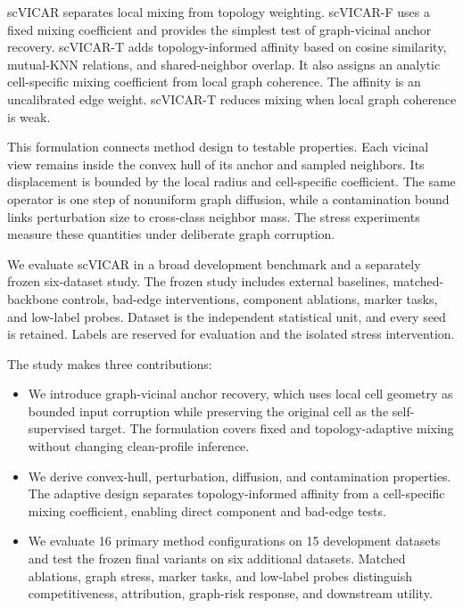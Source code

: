 scVICAR separates local mixing from topology weighting. scVICAR-F uses
a fixed mixing coefficient and provides the simplest test of graph-vicinal
anchor recovery. scVICAR-T adds topology-informed affinity based on cosine
similarity, mutual-KNN relations, and shared-neighbor overlap. It also assigns
an analytic cell-specific mixing coefficient from local graph coherence. The
affinity is an uncalibrated edge weight. scVICAR-T reduces mixing when local
graph coherence is weak.

This formulation connects method design to testable properties. Each vicinal
view remains inside the convex hull of its anchor and sampled neighbors. Its
displacement is bounded by the local radius and cell-specific coefficient. The same
operator is one step of nonuniform graph diffusion, while a contamination bound
links perturbation size to cross-class neighbor mass. The stress experiments
measure these quantities under deliberate graph corruption.

We evaluate scVICAR in a broad development benchmark and a separately frozen
six-dataset study. The frozen study includes external baselines,
matched-backbone controls, bad-edge interventions, component ablations, marker
tasks, and low-label probes. Dataset is the independent statistical unit, and
every seed is retained. Labels are reserved for evaluation and the isolated
stress intervention.

The study makes three contributions:
\begin{itemize}
 \item We introduce graph-vicinal anchor recovery, which uses local cell
 geometry as bounded input corruption while preserving the original cell as
 the self-supervised target. The formulation covers fixed and topology-adaptive
 mixing without changing clean-profile inference.
 \item We derive convex-hull, perturbation, diffusion, and contamination
 properties. The adaptive design separates topology-informed affinity from a
 cell-specific mixing coefficient, enabling direct component and bad-edge tests.
 \item We evaluate 16 primary method configurations on 15 development datasets
 and test the frozen final variants on six additional datasets. Matched
 ablations, graph stress, marker tasks, and low-label probes distinguish
 competitiveness, attribution, graph-risk response, and downstream utility.
\end{itemize}
